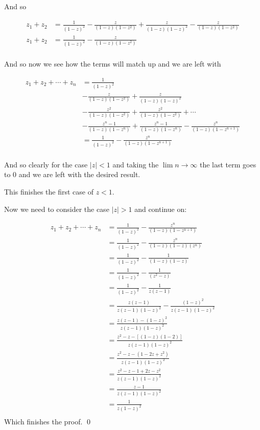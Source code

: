 \begin{enumerate}
	And so 

	\begin{align*}
		z_1 + z_2 &= \frac{1}{(1 - z)^2} - \frac{z}{(1 - z)(1 - z^{2})} + \frac{z}{(1 - z)(1 - z)^2} - \frac{z}{(1 - z)(1 - z^{2})} \\
		z_1 + z_2 &= \frac{1}{(1 - z)^2} - \frac{z}{(1 - z)(1 - z^{2})} \\
	\end{align*}

	And so now we see how the terms will match up and we are left with

	\begin{align*}
		z_1 + z_2 + \cdots + z_n &= \frac{1}{(1 - z)^2} \\
		&- \frac{z}{(1 - z)(1 - z^{2})} + \frac{z}{(1 - z)(1 - z)^2} \\
		&- \frac{z^2}{(1 - z)(1 - z^{2})} + \frac{z^2}{(1 - z)(1 - z^{2})} + \cdots \\
		&- \frac{z^n-1}{(1 - z)(1 - z^{n})} +\frac{z^n-1}{(1 - z)(1 - z^{n})} - \frac{z^n}{(1 - z)(1 - z^{n + 1})} \\
		&= \frac{1}{(1 - z)^2} - \frac{z^n}{(1 - z)(1 - z^{n + 1})} \\
	\end{align*}

	And so clearly for the case $|z| < 1$ and taking the $\lim n \to \infty$ the last term goes to $0$ and we are left 
	with the desired result.

	This finishes the first case of $z < 1$.

	Now we need to consider the case $|z| > 1$ and continue on:

		\begin{align*}
		z_1 + z_2 + \cdots + z_n &= \frac{1}{(1 - z)^2} - \frac{z^n}{(1 - z)(1 - z^{n + 1})} \\
		&= \frac{1}{(1 - z)^2} - \frac{z^n}{(1 - z)(1 - z)(z^n)} \\
		&= \frac{1}{(1 - z)^2} - \frac{1}{(1 - z)(1 - z)} \\
		&= \frac{1}{(1 - z)^2} - \frac{1}{(z^2 - z)} \\
		&= \frac{1}{(1 - z)^2} - \frac{1}{z(z - 1)} \\
		&= \frac{z(z - 1)}{z(z - 1)(1 - z)^2} - \frac{(1 - z)^2}{z(z - 1)(1 - z)^2} \\
		&= \frac{z(z - 1) - (1 - z)^2}{z(z - 1)(1 - z)^2} \\
		&= \frac{z^2 - z  - [(1 - z)(1 - 2)]}{z(z - 1)(1 - z)^2} \\
		&= \frac{z^2 - z  - (1 - 2z + z^2)}{z(z - 1)(1 - z)^2} \\
		&= \frac{z^2 - z  - 1 + 2z - z^2}{z(z - 1)(1 - z)^2} \\
		&= \frac{z - 1}{z(z - 1)(1 - z)^2} \\
		&= \frac{1}{z(1 - z)^2} \\
	\end{align*}
	Which finishes the proof.
	\qed

\end{enumerate}
\newpage